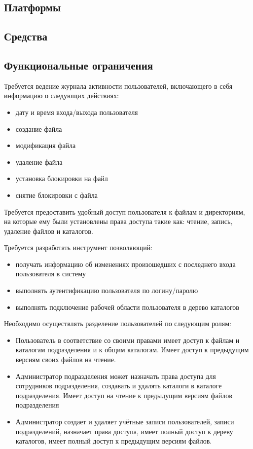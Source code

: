 \documentclass[utf8,usehyperref,12pt]{G7-32}
\begin{document}
\subsection{Платформы}
\subsection{Средства}
\subsection{Функциональные ограничения}

Требуется ведение журнала активности пользователей, включающего в себя информацию о следующих действиях: 
\begin{itemize}
\item дату и время входа/выхода пользователя
\item создание файла
\item модификация файла
\item удаление файла
\item установка блокировки на файл
\item снятие блокировки с файла
\end{itemize}

Требуется предоставить удобный доступ пользователя к файлам и директориям, на которые ему были установлены права доступа такие как: чтение, запись, удаление файлов и каталогов.

Требуется разработать инструмент позволяющий:	
\begin{itemize}
\item получать информацию об изменениях произошедших с последнего входа пользователя в систему	
\item выполнять аутентификацию пользователя по логину/паролю	
\item выполнять подключение рабочей области пользователя в дерево каталогов
\end{itemize}

Необходимо осуществлять разделение пользователей по следующим ролям:	
\begin{itemize}
\item Пользователь 	в соответствие со своими правами имеет 	доступ к файлам и каталогам подразделения и к общим каталогам. Имеет доступ к предыдущим версиям своих файлов на чтение. 		
\item Администратор подразделения может назначать права 	доступа для сотрудников подразделения, создавать и удалять каталоги в каталоге подразделения. Имеет доступ на чтение к предыдущим версиям файлов подразделения	
\item Администратор создает и удаляет учётные записи пользователей, записи подразделений, назначает права доступа, имеет полный 	доступ к дереву каталогов, имеет полный 	доступ к предыдущим версиям файлов.
\end{itemize}
\end{document}
